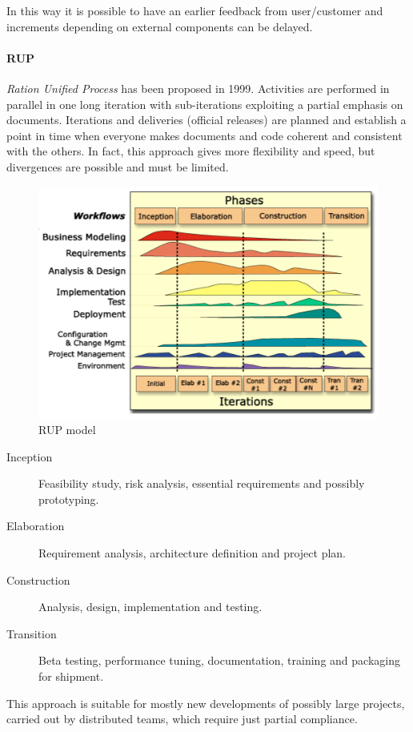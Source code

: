 In this way it is possible to have an earlier feedback from user/customer and increments depending on external components can be delayed.

\paragraph{RUP}
\emph{Ration Unified Process} has been proposed in 1999. Activities are performed in parallel in one long iteration with sub-iterations exploiting a partial emphasis on documents. Iterations and deliveries (official releases) are planned and establish a point in time when everyone makes documents and code coherent and consistent with the others. In fact, this approach gives more flexibility and speed, but divergences are possible and must be limited.

\begin{figure}[hbtp]
\centering
\includegraphics[scale=0.4]{images/rup_model.png}
\caption{RUP model}
\end{figure}

\begin{description}
\item [Inception] Feasibility study, risk analysis, essential requirements and possibly prototyping.
\item [Elaboration] Requirement analysis, architecture definition and project plan.
\item [Construction] Analysis, design, implementation and testing.
\item [Transition] Beta testing, performance tuning, documentation, training and packaging for shipment.
\end{description}
This approach is suitable for mostly new developments of possibly large projects, carried out by distributed teams, which require just partial compliance.

